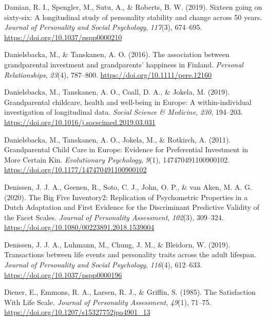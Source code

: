 \documentclass[
  english,
  man, noextraspace,floatsintext]{apa7}
\begin{document}
\leavevmode\hypertarget{ref-damianSixteenGoingSixtysix2019}{}%
Damian, R. I., Spengler, M., Sutu, A., \& Roberts, B. W. (2019). Sixteen going on sixty-six: A longitudinal study of personality stability and change across 50 years. \emph{Journal of Personality and Social Psychology}, \emph{117}(3), 674--695. \url{https://doi.org/10.1037/pspp0000210}

\leavevmode\hypertarget{ref-danielsbackaAssociationGrandparentalInvestment2016}{}%
Danielsbacka, M., \& Tanskanen, A. O. (2016). The association between grandparental investment and grandparents' happiness in Finland. \emph{Personal Relationships}, \emph{23}(4), 787--800. \url{https://doi.org/10.1111/pere.12160}

\leavevmode\hypertarget{ref-danielsbackaGrandparentalChildcareHealth2019}{}%
Danielsbacka, M., Tanskanen, A. O., Coall, D. A., \& Jokela, M. (2019). Grandparental childcare, health and well-being in Europe: A within-individual investigation of longitudinal data. \emph{Social Science \& Medicine}, \emph{230}, 194--203. \url{https://doi.org/10.1016/j.socscimed.2019.03.031}

\leavevmode\hypertarget{ref-danielsbackaGrandparentalChildCare2011}{}%
Danielsbacka, M., Tanskanen, A. O., Jokela, M., \& Rotkirch, A. (2011). Grandparental Child Care in Europe: Evidence for Preferential Investment in More Certain Kin. \emph{Evolutionary Psychology}, \emph{9}(1), 147470491100900102. \url{https://doi.org/10.1177/147470491100900102}

\leavevmode\hypertarget{ref-denissenBigFiveInventory2020}{}%
Denissen, J. J. A., Geenen, R., Soto, C. J., John, O. P., \& van Aken, M. A. G. (2020). The Big Five Inventory2: Replication of Psychometric Properties in a Dutch Adaptation and First Evidence for the Discriminant Predictive Validity of the Facet Scales. \emph{Journal of Personality Assessment}, \emph{102}(3), 309--324. \url{https://doi.org/10.1080/00223891.2018.1539004}

\leavevmode\hypertarget{ref-denissenTransactionsLifeEvents2019}{}%
Denissen, J. J. A., Luhmann, M., Chung, J. M., \& Bleidorn, W. (2019). Transactions between life events and personality traits across the adult lifespan. \emph{Journal of Personality and Social Psychology}, \emph{116}(4), 612--633. \url{https://doi.org/10.1037/pspp0000196}

\leavevmode\hypertarget{ref-dienerSatisfactionLifeScale1985}{}%
Diener, E., Emmons, R. A., Larsen, R. J., \& Griffin, S. (1985). The Satisfaction With Life Scale. \emph{Journal of Personality Assessment}, \emph{49}(1), 71--75. \url{https://doi.org/10.1207/s15327752jpa4901_13}
\end{document}
